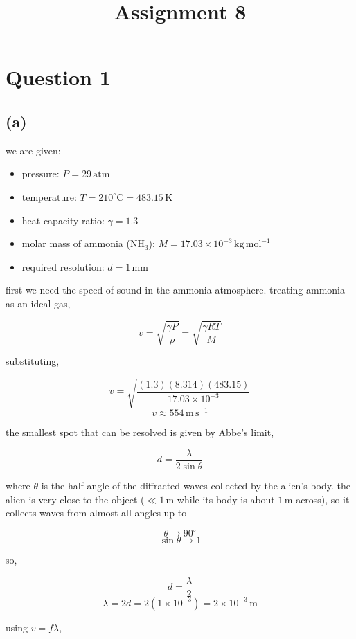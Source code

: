 \documentclass{article}
\title{Assignment 8}
\begin{document}
\maketitle

\section*{Question 1}
 
\subsection*{(a)}

we are given:

\begin{itemize}
    \item pressure: $P=29\,\mathrm{atm}$
    \item temperature: $T=210^\circ\mathrm{C}=483.15\,\mathrm{K}$
    \item heat capacity ratio: $\gamma=1.3$
    \item molar mass of ammonia ($\mathrm{NH_3}$): $M=17.03\times10^{-3}\,\mathrm{kg\,mol^{-1}}$
    \item required resolution: $d=1\,\mathrm{mm}$
\end{itemize}

first we need the speed of sound in the ammonia atmosphere. treating ammonia as an ideal gas,

\[
v=\sqrt{\frac{\gamma P}{\rho}}=\sqrt{\frac{\gamma RT}{M}}
\]

substituting,

\[
v=\sqrt{\frac{(1.3)(8.314)(483.15)}{17.03\times10^{-3}}}
\]
\[
v\approx554\,\mathrm{m\,s^{-1}}
\]

the smallest spot that can be resolved is given by Abbe's limit,

\[
d=\frac{\lambda}{2\sin\theta}
\]

where $\theta$ is the half angle of the diffracted waves collected by the alien's body. the alien is very close to the object ($\ll1\,\mathrm{m}$ while its body is about $1\,\mathrm{m}$ across), so it collects waves from almost all angles up to

\[
\theta\rightarrow90^\circ
\]
\[
\sin\theta\rightarrow1
\]

so,

\[
d=\frac{\lambda}{2}
\]
\[
\lambda=2d=2(1\times10^{-3})=2\times10^{-3}\,\mathrm{m}
\]

using $v=f\lambda$,
\end{document}
